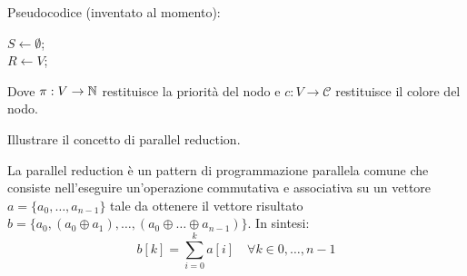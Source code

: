 \begin{questions}
\begin{solution}
        Pseudocodice (inventato al momento):
        \begin{center}
            \begin{minipage}{.7\textwidth}
                \begin{tcolorbox}[
                    colback=white,
                    sharp corners,
                    boxrule=.3mm,
                    left=20pt,
                    top=0pt,
                    bottom=0pt,
                    colbacktitle=white,
                    coltitle=black
                    ]
                    \LinesNumbered
                    \begin{algorithm}[H]
                        \SetAlgoNoEnd
                        $S \leftarrow \emptyset$; \\
                        $R \leftarrow V$;  \\
                    \end{algorithm}
                \end{tcolorbox}
            \end{minipage}
        \end{center}
        
        Dove $\pi: V \rightarrow \mathbb{N}$ restituisce la priorità del nodo e $c: V \rightarrow \mathcal{C}$ restituisce il colore del nodo.
    \end{solution}
    
    \question Illustrare il concetto di parallel reduction.
    
    \begin{solution}
        La parallel reduction è un pattern di programmazione parallela comune che consiste nell'eseguire un'operazione commutativa e associativa su un vettore $a = \{a_0, \dots, a_{n-1}\}$ tale da ottenere il vettore risultato $b = \{a_0, (a_0 \oplus a_1), \dots, (a_0 \oplus \dots \oplus a_{n-1})\}$. In sintesi:
        $$ b[k] = \sum_{i=0}^{k} a[i] \quad \forall k \in 0, \dots, n-1 $$
        

\end{solution}
\end{questions}
